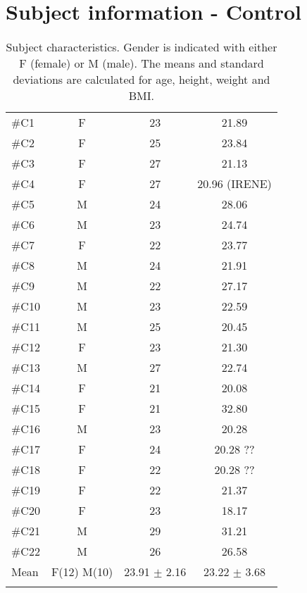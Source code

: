 \section{Subject information - Control}
\begin{longtable}{l|c|c|c}
	\rowcolor[HTML]{C0C0C0} \rule{0pt}{3ex}  \color[HTML]{000000}{Subject} & \color[HTML]{000000}{Gender} & \color[HTML]{000000}{Age}  &  \color[HTML]{000000}{BMI} 
	\\ \hline \rule{0pt}{3ex} 
\#C1 &  F & 23 & 21.89 \\ \hline \hline \rule{0pt}{3ex} 
\#C2 & F & 25 & 23.84 \\ \hline \hline \rule{0pt}{3ex} 
\#C3 & F & 27 & 21.13 \\ \hline \hline \rule{0pt}{3ex} 
\#C4 & F & 27 & 20.96 (IRENE)\\ \hline \hline \rule{0pt}{3ex} 
\#C5 & M & 24 & 28.06 \\ \hline \hline \rule{0pt}{3ex} 
\#C6 & M & 23 &  24.74 \\ \hline \hline \rule{0pt}{3ex} 
\#C7 & F & 22 & 23.77 \\ \hline \hline \rule{0pt}{3ex} 
	\#C8 & M & 24 & 21.91 \\ \hline \hline \rule{0pt}{3ex} 
	\#C9 & M & 22 & 27.17  \\ \hline \hline \rule{0pt}{3ex} 
	\#C10 & M & 23 &  22.59 \\ \hline \hline \rule{0pt}{3ex} 
	\#C11 & M  & 25 & 20.45  \\ \hline \hline \rule{0pt}{3ex} 
\#C12 & F & 23  & 21.30 \\ \hline \hline \rule{0pt}{3ex} 
\#C13 & M & 27 & 22.74 \\ \hline \hline \rule{0pt}{3ex} 
\#C14 & F & 21 & 20.08 \\ \hline \hline \rule{0pt}{3ex} 
\#C15 & F  & 21 & 32.80  \\ \hline \hline \rule{0pt}{3ex} 
\#C16 & M &  23 & 20.28 \\ \hline \hline \rule{0pt}{3ex} 
\#C17 & F & 24 &  20.28 ?? \\ \hline \hline \rule{0pt}{3ex} 
	\#C18 & F & 22  & 20.28 ?? \\ \hline \hline \rule{0pt}{3ex} 
	\#C19 & F  & 22 &  21.37\\ \hline \hline \rule{0pt}{3ex} 
	\#C20 & F & 23  & 18.17   \\ \hline \hline \rule{0pt}{3ex}
		\#C21 &  M & 29 & 31.21 \\ \hline \hline \rule{0pt}{3ex} 
	\#C22 & M & 26 & 26.58  \\ \hline \hline \rule{0pt}{3ex}  	
Mean & F(12) M(10) & 23.91 $\pm$ 2.16 & 23.22 $\pm$ 3.68
	\\ \hline 	
	\caption{Subject characteristics. Gender is indicated with either F (female) or M (male). The means and standard deviations are calculated for age, height, weight and BMI.}
	\label{tab:subjects}
\end{longtable}
\vspace{-.5cm}
